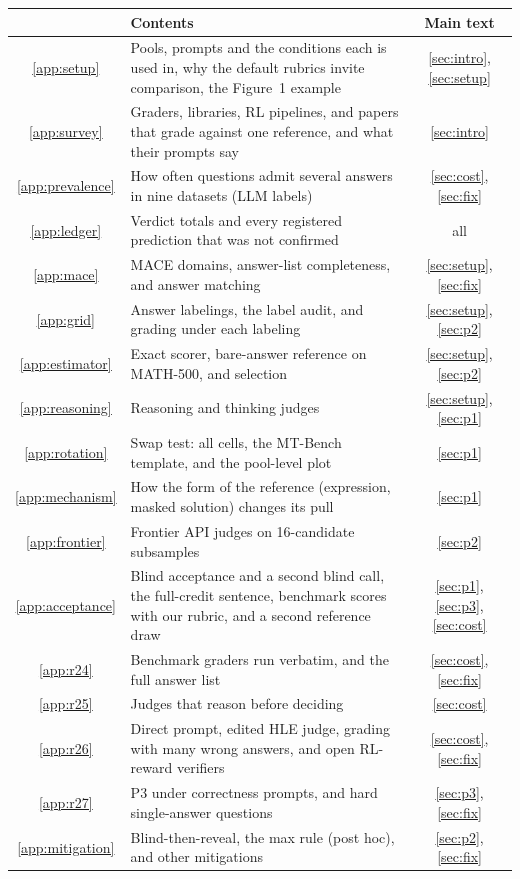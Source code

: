 \begin{center}
\footnotesize
\setlength{\tabcolsep}{4pt}
\renewcommand{\arraystretch}{1.08}
\begin{tabular}{cL{10.6cm}c}
\toprule
& Contents & Main text \\
\midrule
\ref{app:setup} & Pools, prompts and the conditions each is used in, why the default rubrics invite comparison, the Figure~1 example & \ref{sec:intro}, \ref{sec:setup} \\
\ref{app:survey} & Graders, libraries, RL pipelines, and papers that grade against one reference, and what their prompts say & \ref{sec:intro} \\
\ref{app:prevalence} & How often questions admit several answers in nine datasets (LLM labels) & \ref{sec:cost}, \ref{sec:fix} \\
\ref{app:ledger} & Verdict totals and every registered prediction that was not confirmed & all \\
\ref{app:mace} & \textsc{MACE} domains, answer-list completeness, and answer matching & \ref{sec:setup}, \ref{sec:fix} \\
\ref{app:grid} & Answer labelings, the label audit, and grading under each labeling & \ref{sec:setup}, \ref{sec:p2} \\
\ref{app:estimator} & Exact scorer, bare-answer reference on MATH-500, and selection & \ref{sec:setup}, \ref{sec:p2} \\
\ref{app:reasoning} & Reasoning and thinking judges & \ref{sec:setup}, \ref{sec:p1} \\
\ref{app:rotation} & Swap test: all cells, the MT-Bench template, and the pool-level plot & \ref{sec:p1} \\
\ref{app:mechanism} & How the form of the reference (expression, masked solution) changes its pull & \ref{sec:p1} \\
\ref{app:frontier} & Frontier API judges on 16-candidate subsamples & \ref{sec:p2} \\
\ref{app:acceptance} & Blind acceptance and a second blind call, the full-credit sentence, benchmark scores with our rubric, and a second reference draw & \ref{sec:p1}, \ref{sec:p3}, \ref{sec:cost} \\
\ref{app:r24} & Benchmark graders run verbatim, and the full answer list & \ref{sec:cost}, \ref{sec:fix} \\
\ref{app:r25} & Judges that reason before deciding & \ref{sec:cost} \\
\ref{app:r26} & Direct prompt, edited HLE judge, grading with many wrong answers, and open RL-reward verifiers & \ref{sec:cost}, \ref{sec:fix} \\
\ref{app:r27} & P3 under correctness prompts, and hard single-answer questions & \ref{sec:p3}, \ref{sec:fix} \\
\ref{app:mitigation} & Blind-then-reveal, the max rule (post hoc), and other mitigations & \ref{sec:p2}, \ref{sec:fix} \\
\bottomrule
\end{tabular}
\end{center}


